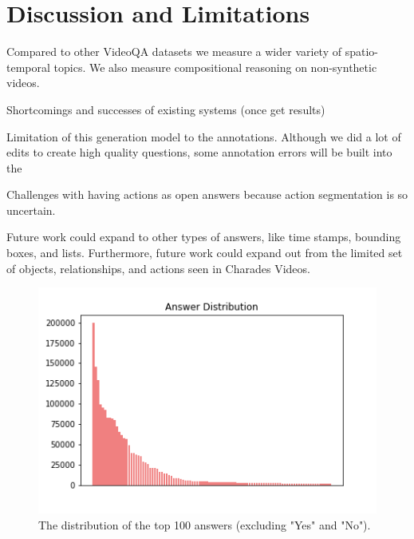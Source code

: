 \documentclass[10pt,twocolumn,letterpaper]{article}
\newcommand{\mgm}[1]{{\color{cyan}{mgm: #1}}}
\begin{document}
\section{Discussion and Limitations}

\mgm{A lot of separate ideas here, need to find a coherent flow}

Compared to other VideoQA datasets we measure a wider variety of spatio-temporal topics. We also measure compositional reasoning on non-synthetic videos. 

Shortcomings and successes of existing systems (once get results)

Limitation of this generation model to the annotations. Although we did a lot of edits to create high quality questions, some annotation errors will be built into the 

Challenges with having actions as open answers because action segmentation is so uncertain.

Future work could expand to other types of answers, like time stamps, bounding boxes, and lists. Furthermore, future work could expand out from the limited set of objects, relationships, and actions seen in Charades Videos. 

\newpage

\begin{figure}[t]
\begin{center}
\includegraphics[width=0.8\linewidth]{Figures/answer_dist.png}
\end{center}
   \caption{The distribution of the top 100 answers (excluding "Yes" and "No").}
\label{answer_dist}
\end{figure}
\end{document}
